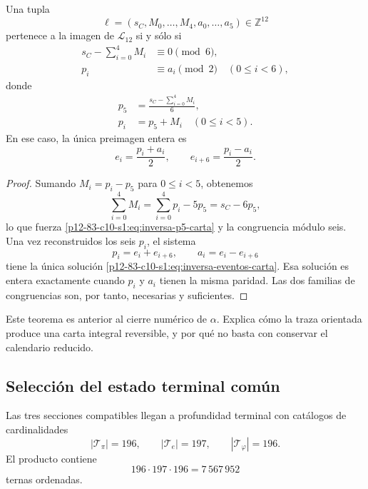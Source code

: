 \begin{theorem}
\label{p12-83-c10-s1:thm:inversion-carta-integral-156}
Una tupla
\[
 \ell=(s_C,M_0,\ldots,M_4,a_0,\ldots,a_5)\in\mathbb Z^{12}
\]
pertenece a la imagen de \(\mathcal L_{12}\) si y sólo si
\begin{align}
 s_C-\sum_{i=0}^{4}M_i&\equiv0\pmod6,
 \label{p12-83-c10-s1:eq:congruencia-seis-carta}\\
 p_i&\equiv a_i\pmod2
 \quad(0\leq i<6),
 \label{p12-83-c10-s1:eq:congruencia-paridad-carta}
\end{align}
donde
\begin{align}
 p_5&=\frac{s_C-\sum_{i=0}^{4}M_i}{6},
 \label{p12-83-c10-s1:eq:inversa-p5-carta}\\
 p_i&=p_5+M_i\quad(0\leq i<5).
 \label{p12-83-c10-s1:eq:inversa-pi-carta}
\end{align}
En ese caso, la única preimagen entera es
\begin{equation}
 e_i=\frac{p_i+a_i}{2},
 \qquad
 e_{i+6}=\frac{p_i-a_i}{2}.
 \label{p12-83-c10-s1:eq:inversa-eventos-carta}
\end{equation}
\end{theorem}

\begin{proof}
Sumando \(M_i=p_i-p_5\) para \(0\leq i<5\), obtenemos
\[
 \sum_{i=0}^{4}M_i
 =\sum_{i=0}^{4}p_i-5p_5
 =s_C-6p_5,
\]
lo que fuerza \eqref{p12-83-c10-s1:eq:inversa-p5-carta} y la congruencia módulo seis.
Una vez reconstruidos los seis \(p_i\), el sistema
\[
 p_i=e_i+e_{i+6},
 \qquad a_i=e_i-e_{i+6}
\]
tiene la única solución \eqref{p12-83-c10-s1:eq:inversa-eventos-carta}. Esa solución es
entera exactamente cuando \(p_i\) y \(a_i\) tienen la misma paridad.
Las dos familias de congruencias son, por tanto, necesarias y suficientes.
\end{proof}

Este teorema es anterior al cierre numérico de \(\alpha\). Explica cómo la
traza orientada produce una carta integral reversible, y por qué no basta
con conservar el calendario reducido.

\subsection{Selección del estado terminal común}

Las tres secciones compatibles llegan a profundidad terminal con catálogos
de cardinalidades
\[
 |\mathcal T_\pi|=196,
 \qquad
 |\mathcal T_e|=197,
 \qquad
 |\mathcal T_\varphi|=196.
\]
El producto contiene
\begin{equation}
 196\cdot197\cdot196=7\,567\,952
 \label{p12-83-c10-s1:eq:cardinal-producto-terminal}
\end{equation}
ternas ordenadas.

